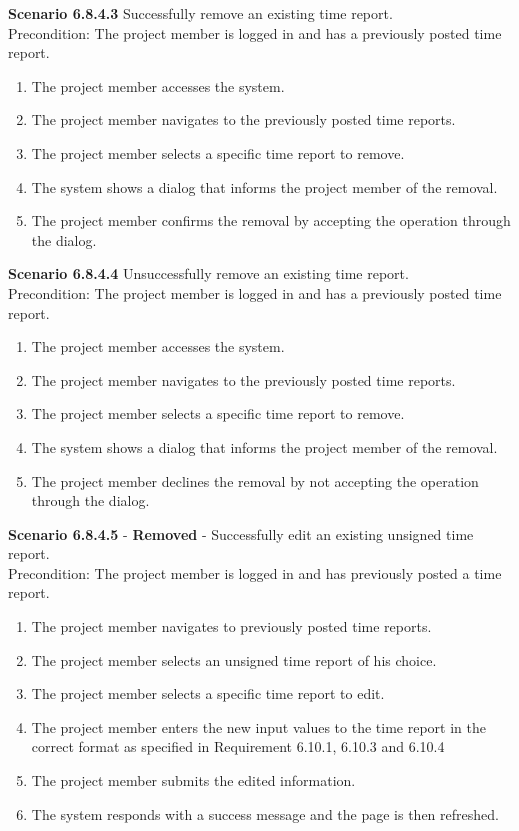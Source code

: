 \documentclass{article}
\begin{document}
\noindent\textbf{Scenario 6.8.4.3} Successfully remove an existing time report. \\
Precondition: The project member is logged in and has a previously posted time report.
\begin{enumerate}
\item The project member accesses the system.
\item The project member navigates to the previously posted time reports.
\item The project member selects a specific time report to remove.
\item The system shows a dialog that informs the project member of the removal.
\item The project member confirms the removal by accepting the operation through the dialog.
\end{enumerate}

\noindent\textbf{Scenario 6.8.4.4} Unsuccessfully remove an existing time report. \\
Precondition: The project member is logged in and has a previously posted time report.
\begin{enumerate}
\item The project member accesses the system.
\item The project member navigates to the previously posted time reports.
\item The project member selects a specific time report to remove.
\item The system shows a dialog that informs the project member of the removal.
\item The project member declines the removal by not accepting the operation through the dialog.
\end{enumerate}

\noindent\textbf{Scenario 6.8.4.5} - \textbf{Removed} - Successfully edit an existing unsigned time report. \\
Precondition: The project member is logged in and has previously posted a time report.
\begin{enumerate}
\item The project member navigates to previously posted time reports.
\item The project member selects an unsigned time report of his choice. 
\item The project member selects a specific time report to edit.
\item The project member enters the new input values to the time report in the correct format as specified in Requirement 6.10.1, 6.10.3 and 6.10.4
\item The project member submits the edited information.
\item The system responds with a success message and the page is then refreshed.
\end{enumerate}
\end{document}
